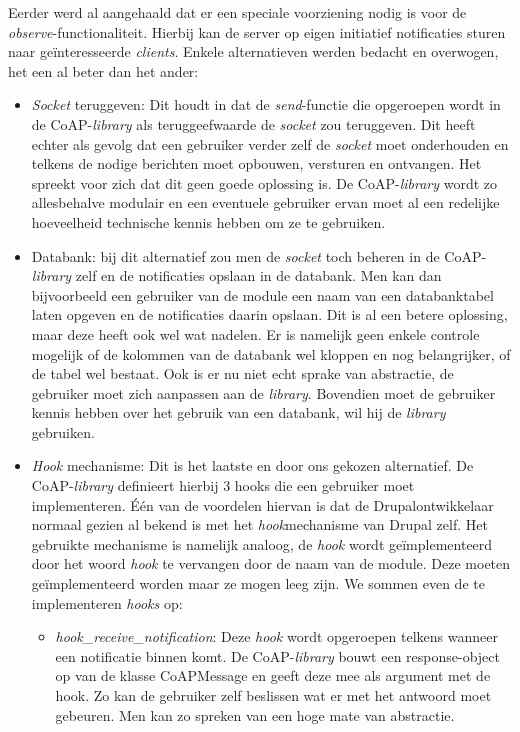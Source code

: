 Eerder werd al aangehaald dat er een speciale voorziening nodig is voor de \textit{observe}-functionaliteit. Hierbij kan de server op eigen initiatief notificaties sturen naar ge\"{i}nteresseerde \textit{clients}. Enkele alternatieven werden bedacht en overwogen, het een al beter dan het ander:
\begin{itemize}
\item \textit{Socket} teruggeven: Dit houdt in dat de \textit{send}-functie die opgeroepen wordt in de CoAP-\textit{library} als teruggeefwaarde de \textit{socket} zou teruggeven. Dit heeft echter als gevolg dat een gebruiker verder zelf de \textit{socket} moet onderhouden en telkens de nodige berichten moet opbouwen, versturen en ontvangen. Het spreekt voor zich dat dit geen goede oplossing is. De CoAP-\textit{library} wordt zo allesbehalve modulair en een eventuele gebruiker ervan moet al een redelijke hoeveelheid technische kennis hebben om ze te gebruiken.
\item Databank: bij dit alternatief zou men de \textit{socket} toch beheren in de CoAP-\textit{library} zelf en de notificaties opslaan in de databank. Men kan dan bijvoorbeeld een gebruiker van de module een naam van een databanktabel laten opgeven en de notificaties daarin opslaan. Dit is al een betere oplossing, maar deze heeft ook wel wat nadelen. Er is namelijk geen enkele controle mogelijk of de kolommen van de databank wel kloppen en nog belangrijker, of de tabel wel bestaat. Ook is er nu niet echt sprake van abstractie, de gebruiker moet zich aanpassen aan de \textit{library}. Bovendien moet de gebruiker kennis hebben over het gebruik van een databank, wil hij de \textit{library} gebruiken.
\item \textit{Hook} mechanisme: Dit is het laatste en door ons gekozen alternatief. De CoAP-\textit{library} definieert hierbij 3 hooks die een gebruiker moet implementeren. \'{E}\'{e}n van de voordelen hiervan is dat de Drupalontwikkelaar normaal gezien al bekend is met het \textit{hook}mechanisme van Drupal zelf. Het gebruikte mechanisme is namelijk analoog, de \textit{hook} wordt ge\"{i}mplementeerd door het woord \textit{hook} te vervangen door de naam van de module. Deze moeten ge\"{i}mplementeerd worden maar ze mogen leeg zijn. We sommen even de te implementeren \textit{hooks} op:
\begin{itemize}
\item \textit{hook\_receive\_notification}: Deze \textit{hook} wordt opgeroepen telkens wanneer een notificatie binnen komt. De CoAP-\textit{library} bouwt een response-object op van de klasse CoAPMessage en geeft deze mee als argument met de hook. Zo kan de gebruiker zelf beslissen wat er met het antwoord moet gebeuren. Men kan zo spreken van een hoge mate van abstractie.

\end{itemize}
\end{itemize}
